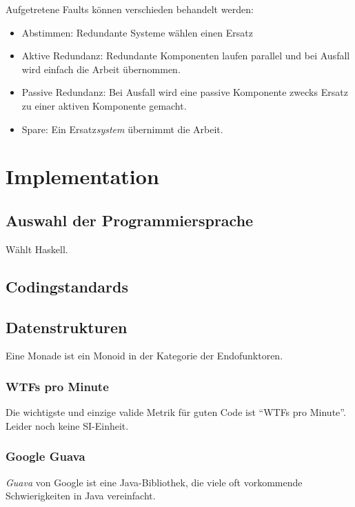 \documentclass{panikzettel}
\begin{document}
Aufgetretene Faults können verschieden behandelt werden: \begin{itemize}
\item Abstimmen: Redundante Systeme wählen einen Ersatz
\item Aktive Redundanz: Redundante Komponenten laufen parallel und bei Ausfall wird einfach die Arbeit übernommen.
\item Passive Redundanz: Bei Ausfall wird eine passive Komponente zwecks Ersatz zu einer aktiven Komponente gemacht.
\item Spare: Ein Ersatz\emph{system} übernimmt die Arbeit.
\end{itemize}

\section{Implementation}

\subsection{Auswahl der Programmiersprache}

Wählt Haskell.

\subsection{Codingstandards}


\subsection{Datenstrukturen}

Eine Monade ist ein Monoid in der Kategorie der Endofunktoren. %

\subsubsection{WTFs pro Minute}
Die wichtigste und einzige valide Metrik für guten Code ist ``WTFs pro Minute''. Leider noch keine SI-Einheit.

\subsubsection{Google Guava}
\label{sec:guava}

\emph{Guava} von Google ist eine Java-Bibliothek, die viele oft vorkommende Schwierigkeiten in Java vereinfacht.
\end{document}
